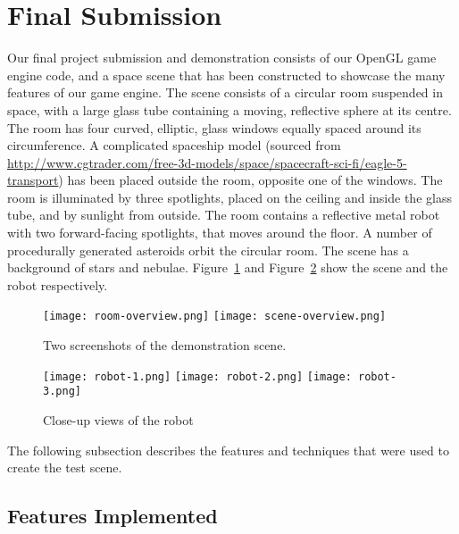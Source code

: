 \documentclass[11pt]{scrartcl} %
\begin{document}
\section{Final Submission}

    Our final project submission and demonstration consists of our OpenGL game
    engine code, and a space scene that has been constructed to showcase the
    many features of our game engine. The scene consists of a circular room
    suspended in space, with a large glass tube containing a moving, reflective
    sphere at its centre. The room has four curved, elliptic, glass windows
    equally spaced around its circumference. A complicated spaceship model
    (sourced from
%
    \url{http://www.cgtrader.com/free-3d-models/space/spacecraft-sci-fi/eagle-5-transport})
%
    has been placed outside the room, opposite one
    of the windows. The room is illuminated by three spotlights, placed on the
    ceiling and inside the glass tube, and by sunlight from outside. The room
    contains a reflective metal robot with two forward-facing spotlights, that
    moves around the floor. A number of procedurally generated asteroids orbit
    the circular room. The scene has a background of stars and nebulae. Figure~\ref{fig:scene-overview}
    and Figure~\ref{fig:robot-closeups} show the scene and the robot respectively.

    \begin{figure}%
        \centering
        \texttt{[image: room-overview.png]}
        \texttt{[image: scene-overview.png]}
        \caption[Demonstration scene]{
            Two screenshots of the demonstration scene.
        }
        \label{fig:scene-overview}
    \end{figure}

    \begin{figure}%
        \centering
        \texttt{[image: robot-1.png]}
        \texttt{[image: robot-2.png]}
        \texttt{[image: robot-3.png]}
        \caption[Space-room exterior]{
            Close-up views of the robot
        }
        \label{fig:robot-closeups}
    \end{figure}

    The following subsection describes the features and techniques that were
    used to create the test scene.

    \subsection{Features Implemented}
\end{document}

